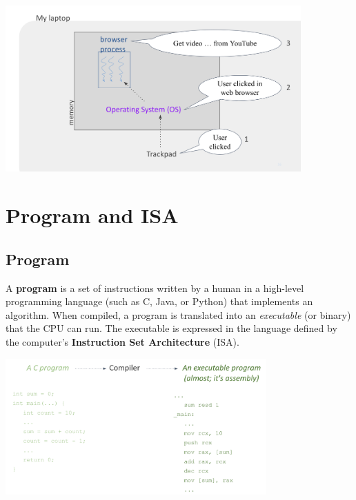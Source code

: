\begin{center}
  \includegraphics[width=0.85\textwidth]{chapters/L1/images/os_youtube.png}
\end{center}

\newpage
\section{Program and ISA}
\subsection{Program}
A \textbf{program} is a set of instructions written by a human in a high-level programming language (such as C, Java, or Python) that implements an algorithm. When compiled, a program is translated into an \emph{executable} (or binary) that the CPU can run. The executable is expressed in the language defined by the computer's \textbf{Instruction Set Architecture} (ISA).

\begin{center}
  \includegraphics[width=0.75\textwidth]{chapters/L1/images/program.png}
\end{center}


